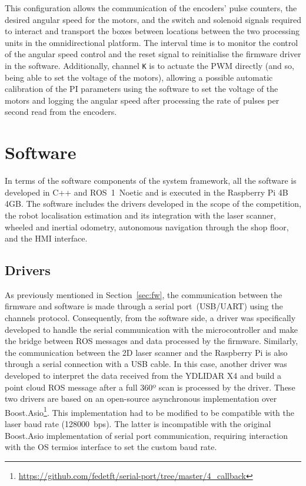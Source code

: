 \documentclass[conference]{IEEEtran}
\begin{document}
This configuration allows the communication of the encoders' pulse counters, the desired angular speed for the motors, and the switch and solenoid signals required to interact and transport the boxes between locations between the two processing units in the omnidirectional platform.
The interval time is to monitor the control of the angular speed control and the reset signal to reinitialise the firmware driver in the software.
Additionally, channel \texttt{K} is to actuate the PWM directly (and so, being able to set the voltage of the motors), allowing a possible automatic calibration of the PI parameters using the software to set the voltage of the motors and logging the angular speed after processing the rate of pulses per second read from the encoders.



\section{Software}\label{sec:sw}

In terms of the software components of the system framework, all the software is developed in C++ and ROS~1~Noetic and is executed in the Raspberry Pi 4B 4GB.
The software includes the drivers developed in the scope of the competition, the robot localisation estimation and its integration with the laser scanner, wheeled and inertial odometry, autonomous navigation through the shop floor, and the HMI interface.



\subsection{Drivers}

As previously mentioned in Section~\ref{sec:fw}, the communication between the firmware and software is made through a serial port~(USB/UART) using the channels protocol.
Consequently, from the software side, a driver was specifically developed to handle the serial communication with the microcontroller and make the bridge between ROS messages and data processed by the firmware.
Similarly, the communication between the 2D laser scanner and the Raspberry Pi is also through a serial connection with a USB cable.
In this case, another driver was developed to interpret the data received from the YDLIDAR X4 and build a point cloud ROS message after a full 360º scan is processed by the driver.
These two drivers are based on an open-source asynchronous implementation over Boost.Asio\footnote{\url{https://github.com/fedetft/serial-port/tree/master/4_callback}}.
This implementation had to be modified to be compatible with the laser baud rate (128000~bps). The latter is incompatible with the original Boost.Asio implementation of serial port communication, requiring interaction with the OS termios interface to set the custom baud rate.
\end{document}

